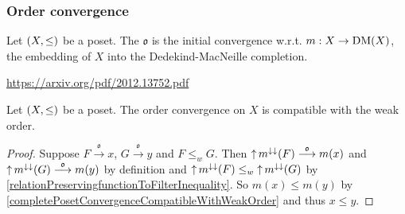 \subsubsection{Order convergence}
\begin{definition}
Let $\sSet{X,\leq}$ be a poset. The  $\mathfrak{o}$ is the initial convergence w.r.t. $m: X \to \operatorname{DM}(X)$, the embedding of $X$ into the Dedekind-MacNeille completion.
\end{definition}

\url{https://arxiv.org/pdf/2012.13752.pdf}

\begin{lemma}
Let $\sSet{X,\leq}$ be a poset. The order convergence on $X$ is compatible with the weak order.
\end{lemma}
\begin{proof}
Suppose $F\overset{\mathfrak{o}}{\longrightarrow} x$, $G\overset{\mathfrak{o}}{\longrightarrow} y$ and $F\leq_w G$. Then $\operatorname{\uparrow} m^{\downarrow\downarrow}(F) \overset{\mathfrak{o}}{\longrightarrow} m(x)$ and $\operatorname{\uparrow} m^{\downarrow\downarrow}(G) \overset{\mathfrak{o}}{\longrightarrow} m(y)$ by definition and $\operatorname{\uparrow} m^{\downarrow\downarrow}(F) \leq_w \operatorname{\uparrow} m^{\downarrow\downarrow}(G)$ by \ref{relationPreservingfunctionToFilterInequality}. So $m(x)\leq m(y)$ by \ref{completePosetConvergenceCompatibleWithWeakOrder} and thus $x\leq y$. 
\end{proof}

